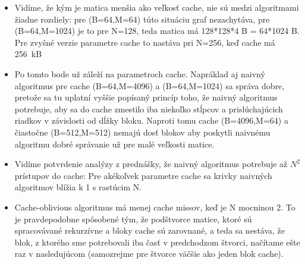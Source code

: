 \documentclass[12pt,a4paper]{article}
\begin{document}
\begin{itemize}
	\item Vidíme, že kým je matica menšia ako veľkosť cache, nie sú medzi algoritmami žiadne rozdiely: pre (B=64,M=64) túto situáciu graf nezachytáva, pre (B=64,M=1024) je to pre N=128, teda matica má 128*128*4 B = 64*1024 B. Pre zvyšné verzie parametre cache to nastáva pri N=256, keď cache má 256~kB
	\item Po tomto bode už záleží na parametroch cache. Napráklad aj naivný algoritmus pre cache (B=64,M=4096) a (B=64,M=1024) sa správa dobre, pretože sa tu uplatní vyššie popísaný princíp toho, že naivný algoritmus potrebuje, aby sa do cache zmestilo iba niekoľko stĺpcov a prislúchajúcich riadkov v závislosti od dĺžky bloku. Naproti tomu cache (B=4096,M=64) a čiastočne (B=512,M=512) nemajú dosť blokov aby poskytli naivnému algoritmu dobré správanie už pre malé veľkosti matice.
	\item Vidíme potvrdenie analýzy z prednášky, že naivný algoritmus potrebuje až $N^2$ prístupov do cache: Pre akékoľvek parametre cache sa krivky naivných algoritmov blížia k 1 s rastúcim N.
	\item Cache-oblivious algoritmus má menej cache missov, keď je N mocninou 2. To je pravdepodobne spôsobené tým, že podštvorce matice, ktoré sú spracovávané rekurzívne a bloky cache sú zarovnané, a teda sa nestáva, že blok, z ktorého sme potrebovali iba časť v predchodzom štvorci, načítame ešte raz v nasledujúcom (samozrejme pre štvorce väčšie ako jeden blok cache).
\end{itemize}
\end{document}
